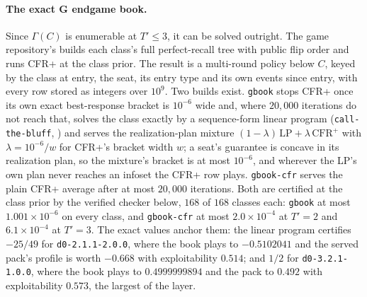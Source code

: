 \documentclass[11pt]{article}
\theoremstyle{plain}
\theoremstyle{definition}
\theoremstyle{remark}
\newcommand{\code}[1]{\texttt{\small #1}}
\begin{document}
\paragraph{The exact G endgame book.} Since $\Gamma(C)$ is enumerable at
$T'\le3$, it can be solved outright. The game repository's
 builds each class's full
perfect-recall tree with public flip order and runs CFR+ at the class
prior. The result is a multi-round policy below $C$, keyed by the
class at entry, the seat, its entry type and its own events since
entry, with every row stored as integers over $10^{9}$. Two builds
exist. \code{gbook} stops CFR+ once its own exact best-response bracket
is $10^{-6}$ wide and, where $20{,}000$ iterations do not reach that,
solves the class exactly by a sequence-form linear program
(\code{call-the-bluff}, ) and serves the
realization-plan mixture $(1-\lambda)\,\mathrm{LP}+\lambda\,\mathrm{CFR}^+$
with $\lambda=10^{-6}/w$ for CFR+'s bracket width $w$; a seat's
guarantee is concave in its realization plan, so the mixture's bracket
is at most $10^{-6}$, and wherever the LP's own plan never reaches an
infoset the CFR+ row plays. \code{gbook-cfr} serves the plain CFR+
average after at most $20{,}000$ iterations. Both are certified at the
class prior by the verified checker below, $168$ of $168$ classes each:
\code{gbook} at most $1.001\times10^{-6}$ on every class, and
\code{gbook-cfr} at most $2.0\times10^{-4}$ at $T'=2$ and
$6.1\times10^{-4}$ at $T'=3$. The exact values anchor them: the
linear program certifies $-25/49$ for \code{d0-2.1.1-2.0.0}, where the
book plays to $-0.5102041$ and the served pack's profile is worth
$-0.668$ with exploitability $0.514$; and $1/2$ for
\code{d0-3.2.1-1.0.0}, where the book plays to $0.4999999894$ and the
pack to $0.492$ with exploitability $0.573$, the largest of the layer.
\end{document}
